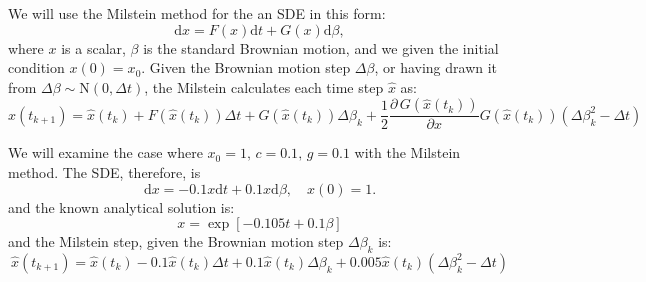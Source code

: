 \documentclass[]{article}
\begin{document}
We will use the Milstein method for the an SDE in this form:
\begin{equation}
\mathrm{d}x = F(x) \mathrm{d}t + G(x) \mathrm{d}\beta,
\end{equation} where \(x\) is a scalar, \(\beta\) is the standard
Brownian motion, and we given the initial condition \(x(0) = x_0\).
Given the Brownian motion step \(\Delta\beta\), or having drawn it from
\(\Delta \beta \sim \mathrm{N}\left(0, \Delta t\right)\), the Milstein
calculates each time step \(\hat{x}\) as: \begin{equation}
\hat{x} (t_{k+1}) = \hat{x} (t_k) + F(\hat{x}(t_k)) \Delta t 
+ G(\hat{x}(t_k)) \Delta \beta_k
+ \dfrac{1}{2} \dfrac{\partial\,G (\hat{x}(t_k))}{\partial x} G (\hat{x}(t_k)) (\Delta \beta_k^2 - \Delta t)
\end{equation}

We will examine the case where \(x_0 = 1, \, c = 0.1, \, g=0.1\) with
the Milstein method. The SDE, therefore, is \begin{equation}
\mathrm{d}x = -0.1x \mathrm{d}t + 0.1 x \mathrm{d}\beta, \quad x(0) = 1.
\end{equation} and the known analytical solution is: \begin{equation}
x = \exp{\left[ -0.105 t + 0.1 \beta\right]}
\end{equation} and the Milstein step, given the Brownian motion step
\(\Delta \beta_k\) is: \begin{equation}
\hat{x} (t_{k+1}) = \hat{x} (t_k) - 0.1 \hat{x}(t_k) \Delta t 
+ 0.1 \hat{x}(t_k) \Delta \beta_k
+ 0.005 \hat{x}(t_k) (\Delta \beta_k^2 - \Delta t)
\end{equation}
\end{document}
